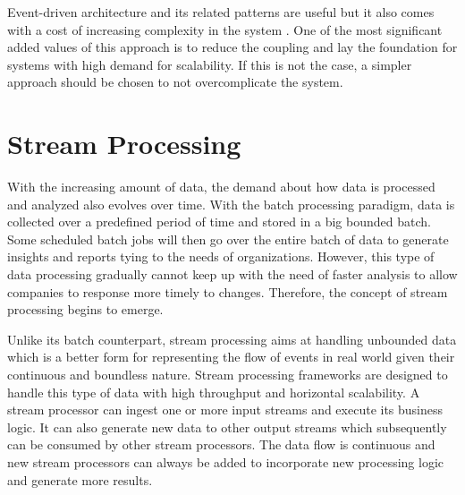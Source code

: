 

Event-driven architecture and its related patterns are useful but it also comes with a cost of increasing complexity in the system \cite{eventsourcingishard}. One of the most significant added values of this approach is to reduce the coupling and lay the foundation for systems with high demand for scalability. If this is not the case, a simpler approach should be chosen to not overcomplicate the system.




\section{Stream Processing} \label{section:eventstreamprocessing}
With the increasing amount of data, the demand about how data is processed and analyzed also evolves over time. With the batch processing paradigm, data is collected over a predefined period of time and stored in a big bounded batch. Some scheduled batch jobs will then go over the entire batch of data to generate insights and reports tying to the needs of organizations. However, this type of data processing gradually cannot keep up with the need of faster analysis to allow companies to response more timely to changes. Therefore, the concept of stream processing begins to emerge.


Unlike its batch counterpart, stream processing aims at handling unbounded data which is a better form for representing the flow of events in real world given their continuous and boundless nature. Stream processing frameworks are designed to handle this type of data with high throughput and horizontal scalability. A stream processor can ingest one or more input streams and execute its business logic. It can also generate new data to other output streams which subsequently can be consumed by other stream processors. The data flow is continuous and new stream processors can always be added to incorporate new processing logic and generate more results.

